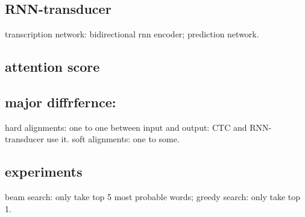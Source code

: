\documentclass[12pt]{article}
\begin{document}
\subsection{RNN-transducer}
transcription network: bidirectional rnn encoder; prediction network.

\subsection{attention score}


\subsection{major diffrfernce:}
hard alignments: one to one between input and output: CTC and RNN-transducer use it.
soft alignments: one to some.

\subsection{experiments}

beam search: only take top 5 most probable words;
greedy search: only take top 1.
\end{document}
